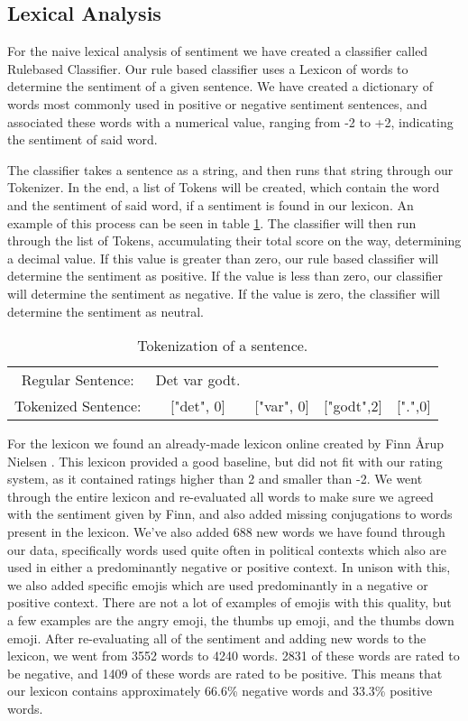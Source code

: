 \subsection{Lexical Analysis} \label{lexical}
For the naive lexical analysis of sentiment we have created a classifier called Rulebased Classifier. Our rule based classifier uses a Lexicon of words to determine the sentiment of a given sentence. We have created a dictionary of words most commonly used in positive or negative sentiment sentences, and associated these words with a numerical value, ranging from -2 to +2, indicating the sentiment of said word.

The classifier takes a sentence as a string, and then runs that string through our Tokenizer. In the end, a list of Tokens will be created, which contain the word and the sentiment of said word, if a sentiment is found in our lexicon. An example of this process can be seen in table \ref{tokenize}. The classifier will then run through the list of Tokens, accumulating their total score on the way, determining a decimal value. If this value is greater than zero, our rule based classifier will determine the sentiment as positive. If the value is less than zero, our classifier will determine the sentiment as negative. If the value is zero, the classifier will determine the sentiment as neutral.

\begin{table}[H]
	\begin{tabular}{ccccc}
		Regular Sentence: &
		Det var godt. & & & \\
		
		Tokenized Sentence: & {[}"det", 0{]}     & {[}"var", 0{]} & {[}"godt",2{]} & {[}".",0{]}                \\
		
	\end{tabular}
	\centering
	\caption{Tokenization of a sentence.}
	\label{tokenize}
\end{table}

For the lexicon we found an already-made lexicon online created by Finn Årup Nielsen \cite{afinn}. This lexicon provided a good baseline, but did not fit with our rating system, as it contained ratings higher than 2 and smaller than -2. We went through the entire lexicon and re-evaluated all words to make sure we agreed with the sentiment given by Finn, and also added missing conjugations to words present in the lexicon. We've also added 688 new words we have found through our data, specifically words used quite often in political contexts which also are used in either a predominantly negative or positive context. In unison with this, we also added specific emojis which are used predominantly in a negative or positive context. There are not a lot of examples of emojis with this quality, but a few examples are the angry emoji, the thumbs up emoji, and the thumbs down emoji. After re-evaluating all of the sentiment and adding new words to the lexicon, we went from 3552 words to 4240 words. 2831 of these words are rated to be negative, and 1409 of these words are rated to be positive. This means that our lexicon contains approximately 66.6\% negative words and 33.3\% positive words.

